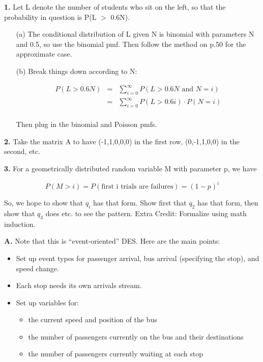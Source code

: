 \documentclass{article}
\begin{document}
\lstset{language=R,basicstyle=\smaller}

{\bf 1.}  Let L denote the number of students who sit on the left, so
that the probability in question is P(L $>$ 0.6N).

\begin{itemize}

\item [(a)] The conditional distribution of L given N is binomial with
parameters N and 0.5, so use the binomial pmf.  Then follow the method
on p.50 for the approximate case.

\item [(b)] Break things down according to N:

\begin{eqnarray}
P(L > 0.6N) &=& \sum_{i=0}^{\infty} P(L > 0.6N \textrm{ and } N = i) \\ 
&=& \sum_{i=0}^{\infty} P(L > 0.6i) \cdot P(N = i) \\ 
\end{eqnarray}

Then plug in the binomial and Poisson pmfs.

\end{itemize}

{\bf 2.}  Take the matrix A to have (-1,1,0,0,0) in the first row,
(0,-1,1,0,0) in the second, etc.

{\bf 3.}  For a geometrically distributed random variable M with parameter
p, we have 

\begin{equation}
P(M > i) = P(\textrm{first i trials are failures}) = (1-p)^i 
\end{equation}

So, we hope to show that $q_i$ has that form.  Show first that $q_2$ has
that form, then show that $q_3$ does etc. to see the pattern.  Extra
Credit:  Formalize using math induction.

{\bf A.}  Note that this is ``event-oriented'' DES.  Here are the main
points:

\begin{itemize}

\item Set up event types for passenger arrival, bus arrival (specifying
the stop), and speed change.  

\item Each stop needs its own arrivals stream.  

\item Set up variables for:

   \begin{itemize}

   \item the current speed and position of the bus

   \item the number of passengers currently on the bus and their destinations

   \item the number of passengers currently waiting at each stop

   \end{itemize}

\end{itemize}
\end{document}
